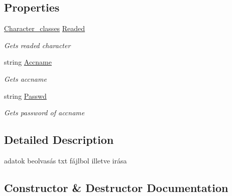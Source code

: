\subsection*{Properties}
\begin{DoxyCompactItemize}
\item 
\hyperlink{class_lightdeath_1_1_character__classes}{Character\+\_\+classes} \hyperlink{class_lightdeath_1_1_data_read___write_a9b5be8a536b39a23b0fb8d3aa21f5614}{Readed}
\begin{DoxyCompactList}\small\item\em Gets readed character \end{DoxyCompactList}\item 
string \hyperlink{class_lightdeath_1_1_data_read___write_af61fd94a64f45b7377dc5f18f29b9869}{Accname}
\begin{DoxyCompactList}\small\item\em Gets accname \end{DoxyCompactList}\item 
string \hyperlink{class_lightdeath_1_1_data_read___write_a63347e71b1ec50329e76e483c6409d81}{Passwd}
\begin{DoxyCompactList}\small\item\em Gets password of accname \end{DoxyCompactList}\end{DoxyCompactItemize}


\subsection{Detailed Description}
adatok beolvasás txt fájlbol illetve irása 



\subsection{Constructor \& Destructor Documentation}
\hypertarget{class_lightdeath_1_1_data_read___write_a6d6d68f8dcfb2d23d6f21942b5b4321d}{}\label{class_lightdeath_1_1_data_read___write_a6d6d68f8dcfb2d23d6f21942b5b4321d} 
